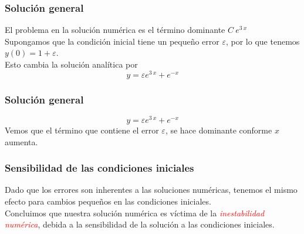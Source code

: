 \begin{frame}
\frametitle{Solución general}
El problema en la solución numérica es el término dominante $C \: e^{3 \: x}$
\\
\medskip
Supongamos que la condición inicial tiene un pequeño error $\varepsilon$, por lo que tenemos $y(0) = 1 + \varepsilon$.
\\
\bigskip
Esto cambia la solución analítica por
\[ y = \varepsilon e^{3 \: x} + e^{-x} \]
\end{frame}
\begin{frame}
\frametitle{Solución general}
\[ y = \varepsilon e^{3 \: x} + e^{-x} \]
Vemos que el término que contiene el error $\varepsilon$, se hace dominante conforme $x$ aumenta. 
\end{frame}
\begin{frame}
\frametitle{Sensibilidad de las condiciones iniciales}
Dado que los errores son inherentes a las soluciones numéricas, tenemos el mismo efecto para cambios pequeños en las condiciones iniciales.
\\
\bigskip
Concluimos que nuestra solución numérica es víctima de la \emph{\textcolor{red}{inestabilidad numérica}}, debida a la sensibilidad de la solución a las condiciones iniciales.
\end{frame}
